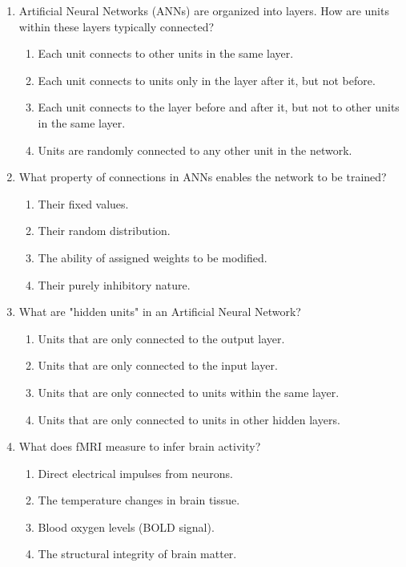\documentclass{article}
\begin{document}
\begin{enumerate}[label=\arabic*.]
\item Artificial Neural Networks (ANNs) are organized into layers. How are units within these layers typically connected?
\begin{enumerate}[label=(\alph*)]
    \item Each unit connects to other units in the same layer.
    \item Each unit connects to units only in the layer after it, but not before.
    \item Each unit connects to the layer before and after it, but not to other units in the same layer.
    \item Units are randomly connected to any other unit in the network.
\end{enumerate}

\item What property of connections in ANNs enables the network to be trained?
\begin{enumerate}[label=(\alph*)]
    \item Their fixed values.
    \item Their random distribution.
    \item The ability of assigned weights to be modified.
    \item Their purely inhibitory nature.
\end{enumerate}

\item What are "hidden units" in an Artificial Neural Network?
\begin{enumerate}[label=(\alph*)]
    \item Units that are only connected to the output layer.
    \item Units that are only connected to the input layer.
    \item Units that are only connected to units within the same layer.
    \item Units that are only connected to units in other hidden layers.
\end{enumerate}

\item What does fMRI measure to infer brain activity?
\begin{enumerate}[label=(\alph*)]
    \item Direct electrical impulses from neurons.
    \item The temperature changes in brain tissue.
    \item Blood oxygen levels (BOLD signal).
    \item The structural integrity of brain matter.
\end{enumerate}


\end{enumerate}
\end{document}
